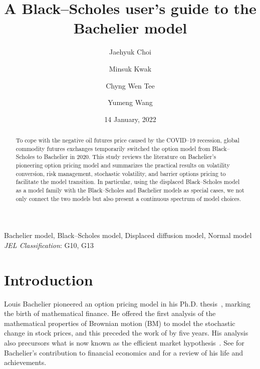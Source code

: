 \documentclass[a4paper,review]{elsarticle}
\begin{document}
\begin{frontmatter}

\title{A Black--Scholes user's guide to the Bachelier model}

\date{14 January, 2022}

\author[phbs]{Jaehyuk Choi}

\author[hufs]{Minsuk Kwak}

\author[smu]{Chyng Wen Tee}

\author[jtb]{Yumeng Wang}


\address[phbs]{Peking University HSBC Business School, Shenzhen, China}
\address[hufs]{Department of Mathematics, Hankuk University of Foreign Studies, Yongin, Republic of Korea} 
\address[smu]{Lee Kong Chian School of Business, Singapore Management University, Singapore}
\address[jtb]{Bank of Communications, Shanghai, China}

\begin{abstract} %
To cope with the negative oil futures price caused by the COVID--19 recession, global commodity futures exchanges temporarily switched the option model from Black--Scholes to Bachelier in 2020. This study reviews the literature on Bachelier's pioneering option pricing model and summarizes the practical results on volatility conversion, risk management, stochastic volatility, and barrier options pricing to facilitate the model transition. In particular, using the displaced Black--Scholes model as a model family with the Black--Scholes and Bachelier models as special cases, we not only connect the two models but also present a continuous spectrum of model choices.
\end{abstract}
\begin{keyword}
	Bachelier model, Black--Scholes model, Displaced diffusion model, Normal model\\
	\textit{JEL Classification}: G10, G13
\end{keyword}
\end{frontmatter}

\section{Introduction} \noindent
Louis Bachelier pioneered an option pricing model in his Ph.D. thesis~\citep{bachelier1900}, marking the birth of mathematical finance. He offered the first analysis of the mathematical properties of Brownian motion (BM) to model the stochastic change in stock prices, and this preceded the work of \citet{einstein1905bm} by five years. His analysis also precursors what is now known as the efficient market hypothesis~\citep{schachermayer2008close}. See \citet{sullivan1991louis} for Bachelier's contribution to financial economics and \citet{courtault2000louis} for a review of his life and achievements.
\end{document}

